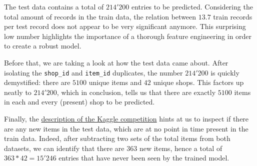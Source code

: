 The test data contains a total of $214'200$ entries to be predicted. Considering the total amount of records in the train data, the relation between $13.7$ train records per test record does not appear to be very significant anymore. This surprising low number highlights the importance of a thorough feature engineering in order to create a robust model.

Before that, we are taking a look at how the test data came about. After isolating the \texttt{shop\_id} and \texttt{item\_id} duplicates, the number $214'200$ is quickly demystified: there are $5100$ unique items and $42$ unique shops. This factors up neatly to $214'200$, which in conclusion, tells us that there are exactly $5100$ items in each and every (present) shop to be predicted.

Finally, the \href{https://www.kaggle.com/c/competitive-data-science-predict-future-sales/data}{description of the Kaggle competition} hints at us to inspect if there are any new items in the test data, which are at no point in time present in the train data. Indeed, after subtracting two sets of the total items from both datasets, we can identify that there are $363$ new items, hence a total of $363*42=15'246$ entries that have never been seen by the trained model.
